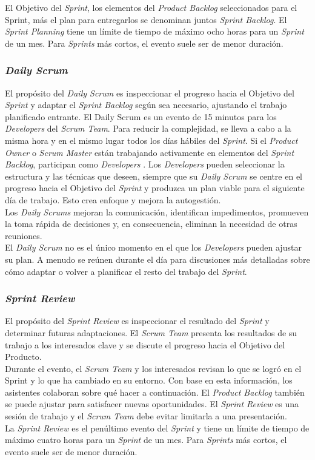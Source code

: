\begin{spacing}{1.5}
\begin{itemize}
				El Objetivo del \textit{Sprint}, los elementos del \textit{Product Backlog} seleccionados para el Sprint, más el plan para entregarlos se denominan juntos \textit{Sprint Backlog}.
				El \textit{Sprint Planning} tiene un límite de tiempo de máximo ocho horas para un \textit{Sprint} de un mes. Para \textit{Sprints} más cortos, el evento suele ser de menor duración.
			\end{itemize}
		\subsubsection{\textit{Daily Scrum}}
			El propósito del \textit{Daily Scrum} es inspeccionar el progreso hacia el Objetivo del \textit{Sprint} y adaptar el \textit{Sprint Backlog} según sea necesario, ajustando el trabajo planificado entrante. El Daily Scrum es un evento de 15 minutos para los \textit{Developers} del \textit{Scrum Team}. Para reducir la complejidad, se lleva a cabo a la misma hora y en el mismo lugar todos los días hábiles del \textit{Sprint}. Si el \textit{Product Owner} o \textit{Scrum Master} están trabajando activamente en elementos del \textit{Sprint Backlog}, participan como \textit{Developers} \cite{chap2_scrum}.
			Los \textit{Developers} pueden seleccionar la estructura y las técnicas que deseen, siempre que su \textit{Daily Scrum} se centre en el progreso hacia el Objetivo del \textit{Sprint} y produzca un plan viable para el siguiente día de trabajo. Esto crea enfoque y mejora la autogestión.\\
			Los \textit{Daily Scrums} mejoran la comunicación, identifican impedimentos, promueven la toma rápida de
			decisiones y, en consecuencia, eliminan la necesidad de otras reuniones.\\
			El \textit{Daily Scrum} no es el único momento en el que los \textit{Developers} pueden ajustar su plan. A menudo se reúnen durante el día para discusiones más detalladas sobre cómo adaptar o volver a planificar el resto del trabajo del \textit{Sprint}.
		\subsubsection{\textit{Sprint Review}}
			El propósito del \textit{Sprint Review} es inspeccionar el resultado del \textit{Sprint} y determinar futuras	adaptaciones. El \textit{Scrum Team} presenta los resultados de su trabajo a los interesados clave y se discute el progreso hacia el Objetivo del Producto.\\
			Durante el evento, el \textit{Scrum Team} y los interesados revisan lo que se logró en el Sprint y lo que ha cambiado en su entorno. Con base en esta información, los asistentes colaboran sobre qué hacer a
			continuación. El \textit{Product Backlog} también se puede ajustar para satisfacer nuevas oportunidades. El \textit{Sprint Review} es una sesión de trabajo y el \textit{Scrum Team} debe evitar limitarla a una presentación.\\
			La \textit{Sprint Review} es el penúltimo evento del \textit{Sprint} y tiene un límite de tiempo de máximo cuatro horas para un \textit{Sprint} de un mes. Para \textit{Sprints} más cortos, el evento suele ser de menor duración.

\end{spacing}
